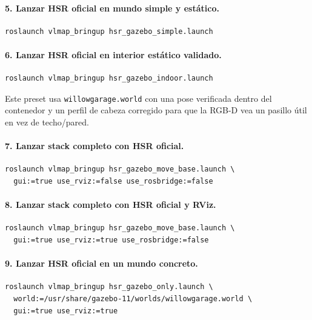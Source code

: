 \documentclass[11pt,a4paper]{article}
\begin{document}
\paragraph{5. Lanzar HSR oficial en mundo simple y estático.}

\begin{verbatim}
roslaunch vlmap_bringup hsr_gazebo_simple.launch
\end{verbatim}

\paragraph{6. Lanzar HSR oficial en interior estático validado.}

\begin{verbatim}
roslaunch vlmap_bringup hsr_gazebo_indoor.launch
\end{verbatim}

Este preset usa \texttt{willowgarage.world} con una pose verificada dentro del
contenedor y un perfil de cabeza corregido para que la RGB-D vea un pasillo útil
en vez de techo/pared.

\paragraph{7. Lanzar stack completo con HSR oficial.}

\begin{verbatim}
roslaunch vlmap_bringup hsr_gazebo_move_base.launch \
  gui:=true use_rviz:=false use_rosbridge:=false
\end{verbatim}

\paragraph{8. Lanzar stack completo con HSR oficial y RViz.}

\begin{verbatim}
roslaunch vlmap_bringup hsr_gazebo_move_base.launch \
  gui:=true use_rviz:=true use_rosbridge:=false
\end{verbatim}

\paragraph{9. Lanzar HSR oficial en un mundo concreto.}

\begin{verbatim}
roslaunch vlmap_bringup hsr_gazebo_only.launch \
  world:=/usr/share/gazebo-11/worlds/willowgarage.world \
  gui:=true use_rviz:=true
\end{verbatim}
\end{document}
